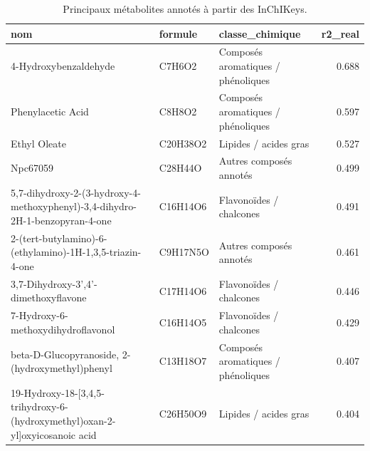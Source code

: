\begin{table}
\caption{Principaux métabolites annotés à partir des InChIKeys.}
\label{tab:ch6_annotated_metabolites}
\begin{tabular}{lllr}
\toprule
nom & formule & classe\_chimique & r2\_real \\
\midrule
4-Hydroxybenzaldehyde & C7H6O2 & Composés aromatiques / phénoliques & 0.688 \\
Phenylacetic Acid & C8H8O2 & Composés aromatiques / phénoliques & 0.597 \\
Ethyl Oleate & C20H38O2 & Lipides / acides gras & 0.527 \\
Npc67059 & C28H44O & Autres composés annotés & 0.499 \\
5,7-dihydroxy-2-(3-hydroxy-4-methoxyphenyl)-3,4-dihydro-2H-1-benzopyran-4-one & C16H14O6 & Flavonoïdes / chalcones & 0.491 \\
2-(tert-butylamino)-6-(ethylamino)-1H-1,3,5-triazin-4-one & C9H17N5O & Autres composés annotés & 0.461 \\
3,7-Dihydroxy-3',4'-dimethoxyflavone & C17H14O6 & Flavonoïdes / chalcones & 0.446 \\
7-Hydroxy-6-methoxydihydroflavonol & C16H14O5 & Flavonoïdes / chalcones & 0.429 \\
beta-D-Glucopyranoside, 2-(hydroxymethyl)phenyl & C13H18O7 & Composés aromatiques / phénoliques & 0.407 \\
19-Hydroxy-18-[3,4,5-trihydroxy-6-(hydroxymethyl)oxan-2-yl]oxyicosanoic acid & C26H50O9 & Lipides / acides gras & 0.404 \\
\bottomrule
\end{tabular}
\end{table}
